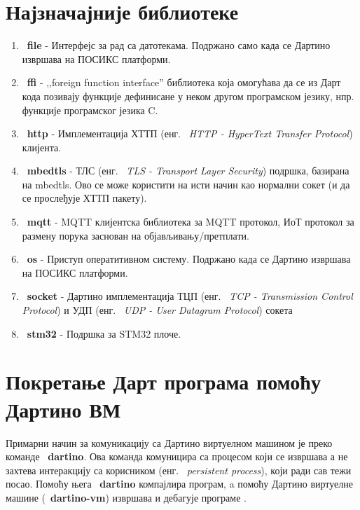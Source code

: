 \documentclass[12pt,oneside]{memoir}
\begin{document}
\section{Најзначајније библиотеке}
\begin{enumerate}

\item ~\textbf{file} - Интерфејс за рад са датотекама. Подржано само када се Дартино извршава на ПОСИКС платформи.

\item ~\textbf{ffi} - ,,foreign function interface'' библиотека која омогућава да се из Дарт кода позивају функције дефинисане у неком другом програмском језику, нпр. функције програмског језика C.

\item ~\textbf{http} - Имплементација ХТТП (енг. ~\textit{HTTP - HyperText Transfer Protocol}) клијента.

\item ~\textbf{mbedtls} - ТЛС (енг. ~\textit{TLS - Transport Layer Security}) подршка, базирана на mbedtls. Ово се може користити на исти начин као нормални сокет (и да се прослеђује ХТТП пакету).

\item ~\textbf{mqtt} - MQTT клијентска библиотека за MQTT протокол, ИоТ протокол за размену порука заснован на објављивању/претплати.

\item ~\textbf{os} - Приступ оператитивном систему. Подржано када се Дартино извршава на ПОСИКС платформи.

\item ~\textbf{socket} - Дартино имплементација ТЦП (енг. ~\textit{TCP - Transmission Control Protocol}) и УДП (енг. ~\textit{UDP - User Datagram Protocol}) сокета

\item ~\textbf{stm32} - Подршка за STM32 плоче.

\end{enumerate}

\section{Покретање Дарт програма помоћу Дартино ВМ}
\label{sec:pokretanje}

Примарни начин за комуникацију са Дартино виртуелном машином је преко команде ~\textbf{dartino}. Ова команда комуницира са процесом који се извршава а не захтева интеракцију са корисником (енг. ~\textit{persistent process}), који ради сав тежи посао. Помоћу њега ~\textbf{dartino} компајлира програм, a помоћу Дартино виртуелне машине (~\textbf{dartino-vm}) извршава и дебагује програме .\\
\end{document}
